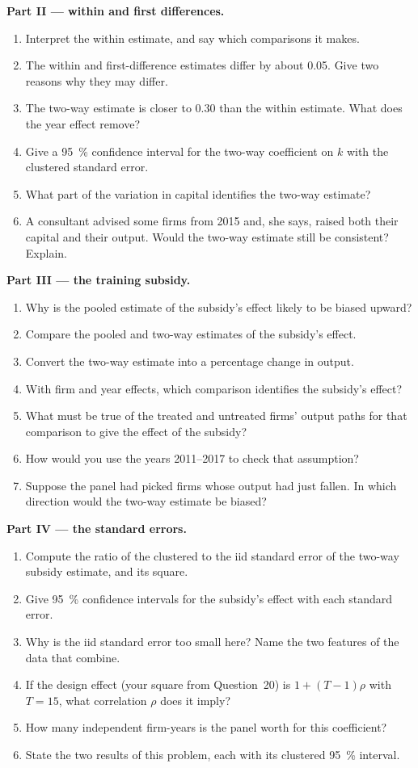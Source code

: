 \begin{problem}
\medskip\noindent\textbf{Part II --- within and first differences.}
\begin{enumerate}[resume]
\item Interpret the within estimate, and say which comparisons it makes.
\item The within and first-difference estimates differ by about 0.05. Give two
reasons why they may differ.
\item The two-way estimate is closer to 0.30 than the within estimate. What
does the year effect remove?
\item Give a 95~\% confidence interval for the two-way coefficient on $k$ with
the clustered standard error.
\item What part of the variation in capital identifies the two-way estimate?
\item A consultant advised some firms from 2015 and, she says, raised both their
capital and their output. Would the two-way estimate still be consistent?
Explain.
\end{enumerate}

\medskip\noindent\textbf{Part III --- the training subsidy.}
\begin{enumerate}[resume]
\item Why is the pooled estimate of the subsidy's effect likely to be biased
upward?
\item Compare the pooled and two-way estimates of the subsidy's effect.
\item Convert the two-way estimate into a percentage change in output.
\item With firm and year effects, which comparison identifies the subsidy's
effect?
\item What must be true of the treated and untreated firms' output paths for
that comparison to give the effect of the subsidy?
\item How would you use the years 2011--2017 to check that assumption?
\item Suppose the panel had picked firms whose output had just fallen. In which
direction would the two-way estimate be biased?
\end{enumerate}

\medskip\noindent\textbf{Part IV --- the standard errors.}
\begin{enumerate}[resume]
\item Compute the ratio of the clustered to the iid standard error of the
two-way subsidy estimate, and its square.
\item Give 95~\% confidence intervals for the subsidy's effect with each standard
error.
\item Why is the iid standard error too small here? Name the two features of
the data that combine.
\item If the design effect (your square from Question~20) is $1 + (T - 1)\rho$
with $T = 15$, what correlation $\rho$ does it imply?
\item How many independent firm-years is the panel worth for this coefficient?
\item State the two results of this problem, each with its clustered 95~\%
interval.
\end{enumerate}
\end{problem}
